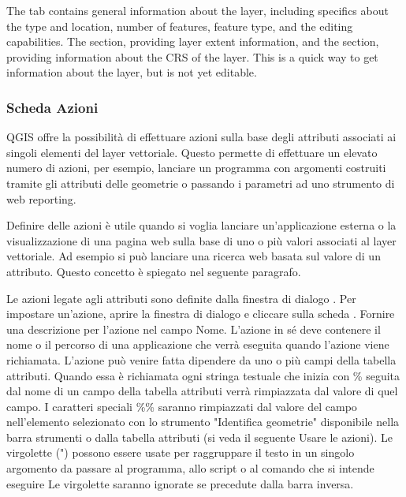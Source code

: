 The  tab contains general information about the layer,
including specifics about the type and location, number of features, feature
type, and the editing capabilities. The  section,
providing
layer extent information, and the 
section, providing information about the CRS of the layer. This is a quick
way to get information about the layer, but is not yet editable.

\subsubsection{Scheda Azioni}\label{label_actions}

QGIS offre la possibilità di effettuare azioni sulla base degli
attributi associati ai singoli elementi del layer vettoriale.
Questo permette di effettuare un elevato numero di azioni, per esempio,
lanciare un programma con argomenti costruiti tramite gli attributi
delle geometrie o passando i parametri ad uno strumento di web reporting.

Definire delle azioni è utile quando si voglia lanciare un'applicazione
esterna o la visualizzazione di una pagina web sulla base di uno o più valori
associati al layer vettoriale. Ad esempio si può lanciare una ricerca web
basata sul valore di un attributo. Questo concetto è spiegato nel seguente
paragrafo.


Le azioni legate agli attributi sono definite dalla finestra di dialogo
. Per impostare un'azione, aprire la finestra
di dialogo  e cliccare sulla scheda
. Fornire una descrizione per l'azione nel campo Nome. L'azione in
sé deve contenere il nome o il percorso di una applicazione che verrà eseguita quando
l'azione viene richiamata. L'azione può venire fatta dipendere da uno o più campi della tabella
attributi. Quando essa è richiamata ogni stringa testuale che inizia con \%
seguita dal nome di un campo della tabella attributi verrà rimpiazzata dal
valore di quel campo. I caratteri speciali \%\% saranno
rimpiazzati dal valore del campo nell'elemento selezionato con lo strumento
"Identifica geometrie" disponibile nella barra strumenti o dalla tabella attributi (si veda il seguente Usare le azioni). Le virgolette
(") possono essere usate per raggruppare il testo in un singolo argomento da
passare al programma, allo script o al comando che si intende eseguire Le
virgolette saranno ignorate se precedute dalla barra inversa.

